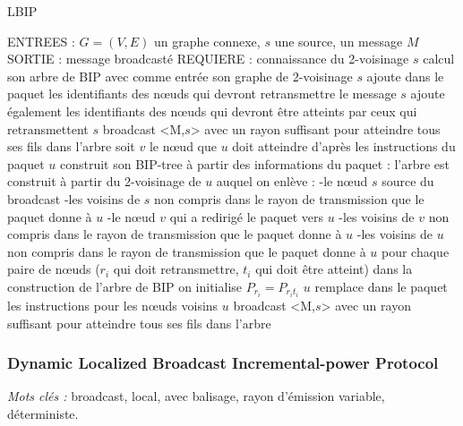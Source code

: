 \begin{algorithm}[H]
\caption{LBIP}
\label{algo_LBIP}
\begin{algorithmic}
\STATE ENTREES : $G=(V,E)$ un graphe connexe, $s$ une source, un message $M$
\STATE SORTIE : message broadcasté
\STATE REQUIERE : connaissance du 2-voisinage
\STATE $s$ calcul son arbre de BIP avec comme entrée son graphe de 2-voisinage
\STATE $s$ ajoute dans le paquet les identifiants des nœuds qui devront retransmettre le message
\STATE $s$ ajoute également les identifiants des nœuds qui devront être atteints par ceux qui retransmettent
\STATE $s$ broadcast <M,$s$> avec un rayon suffisant pour atteindre tous ses fils dans l'arbre
		\STATE soit $v$ le nœud que $u$ doit atteindre d'après les instructions du paquet
		\STATE $u$ construit son BIP-tree à partir des informations du paquet :
			 \INDSTATE l'arbre est construit à partir du 2-voisinage de $u$ auquel on enlève :
			 	 \INDSTATE[2]-le nœud $s$ source du broadcast
				 \INDSTATE[2]-les voisins de $s$ non compris dans le rayon de transmission que le paquet donne à $u$
				 \INDSTATE[2]-le nœud $v$ qui a redirigé le paquet vers $u$
				 \INDSTATE[2]-les voisins de $v$ non compris dans le rayon de transmission que le paquet donne à $u$
				 \INDSTATE[2]-les voisins de $u$ non compris dans le rayon de transmission que le paquet donne à $u$
			\INDSTATE[1] pour chaque paire de nœuds ($r_i$ qui doit retransmettre, $t_i$ qui doit être atteint)
				\INDSTATE[2] dans la construction de l'arbre de BIP on initialise $P_{r_i} = P_{r_i t_i}$
			\INDSTATE[1] $u$ remplace dans le paquet les instructions pour les nœuds voisins
			\INDSTATE[1] $u$ broadcast <M,$s$> avec un rayon suffisant pour atteindre tous ses fils dans l'arbre
	\ENDIF
\ENDIF
\end{algorithmic}
\end{algorithm}





\subsubsection{Dynamic Localized Broadcast Incremental-power Protocol \cite{Champ2009DLBIP}}
\emph{Mots clés :} broadcast, local, avec balisage, rayon d'émission variable, déterministe.

